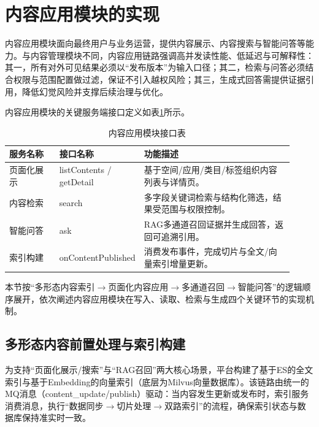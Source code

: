\section{内容应用模块的实现}
\label{sec:impl_ca}

内容应用模块面向最终用户与业务运营，提供内容展示、内容搜索与智能问答等能力。与内容管理模块不同，内容应用链路强调高并发读性能、低延迟与可解释性：其一，所有对外可见结果必须以“发布版本”为输入口径；其二，检索与问答必须结合权限与范围配置做过滤，保证不引入越权风险；其三，生成式回答需提供证据引用，降低幻觉风险并支撑后续治理与优化\cite{lewis2020retrieval,huang2025survey}。

内容应用模块的关键服务端接口定义如表\ref{tab:ca_api}所示。

\begin{table}[!htbp]
  \centering
  \caption{内容应用模块接口表}
  \label{tab:ca_api}
  \small
  \begin{tabular}{>{\raggedright\arraybackslash}p{0.18\linewidth}|>{\raggedright\arraybackslash}p{0.20\linewidth}|>{\raggedright\arraybackslash}p{0.54\linewidth}}
    \hline
    服务名称 & 接口名称 & 功能描述 \\ \hline
    页面化展示 & listContents / getDetail & 基于空间/应用/类目/标签组织内容列表与详情页。 \\ \hline
    内容检索 & search & 多字段关键词检索与结构化筛选，结果受范围与权限控制。 \\ \hline
    智能问答 & ask & RAG多通道召回证据并生成回答，返回可追溯引用。 \\ \hline
    索引构建 & onContentPublished & 消费发布事件，完成切片与全文/向量索引增量更新。 \\ \hline
  \end{tabular}
\end{table}

本节按“多形态内容索引$\rightarrow$页面化内容应用$\rightarrow$多通道召回$\rightarrow$智能问答”的逻辑顺序展开，依次阐述内容应用模块在写入、读取、检索与生成四个关键环节的实现机制。

\subsection{多形态内容前置处理与索引构建}
\label{subsec:impl_ca_index}

为支持“页面化展示/搜索”与“RAG召回”两大核心场景，平台构建了基于ES的全文索引与基于Embedding的向量索引（底层为Milvus向量数据库）\cite{wang2021milvus,lewis2020retrieval}。该链路由统一的MQ消息（content\_update/publish）驱动：当内容发生更新或发布时，索引服务消费消息，执行“数据同步$\rightarrow$切片处理$\rightarrow$双路索引”的流程，确保索引状态与数据库保持准实时一致。

